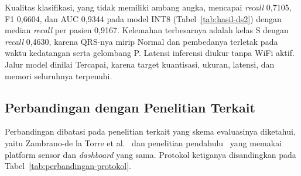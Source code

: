 Kualitas klasifikasi, yang tidak memiliki ambang angka, mencapai \textit{recall} 0,7105, F1 0,6604, dan AUC 0,9344 pada model INT8 (Tabel~\ref{tab:hasil-ds2}) dengan median \textit{recall} per pasien 0,9167. Kelemahan terbesarnya adalah kelas S dengan \textit{recall} 0,4630, karena QRS-nya mirip Normal dan pembedanya terletak pada waktu kedatangan serta gelombang P. Latensi inferensi diukur tanpa WiFi aktif. Jalur model dinilai Tercapai, karena target kuantisasi, ukuran, latensi, dan memori seluruhnya terpenuhi.

\subsection{Perbandingan dengan Penelitian Terkait}

Perbandingan dibatasi pada penelitian terkait yang skema evaluasinya diketahui, yaitu Zambrano-de la Torre et al.~\cite{zambrano_2026} dan penelitian pendahulu~\cite{mulyawan_2026} yang memakai platform sensor dan \textit{dashboard} yang sama. Protokol ketiganya disandingkan pada Tabel~\ref{tab:perbandingan-protokol}.

